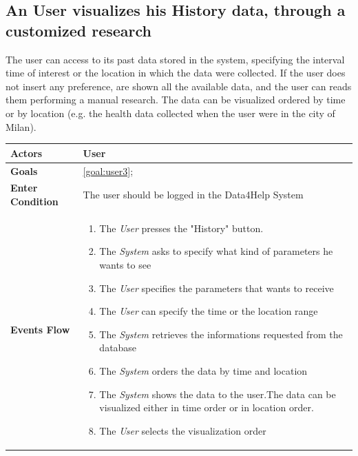  \subsection{An User visualizes his History data, through a customized research}
 
The user can access to its past data stored in the system, specifying the interval time of interest or the location in which the data were collected. If the user does not insert any preference, are shown all the available data, and the user can reads them performing a manual research.
The data can be visualized ordered by time or by location (e.g. the health data collected when the user were in the city of Milan).




\begin{table}[H]
	\centering
    
    \begin{tabular}{|p{3.5cm}|p{10.3cm}|}
    
    \hline
    \textbf{\large{Actors}}  			& \tabitem  User  				\\
    				 	

    \hline
    \textbf{\large{Goals}} 				&\ref{goal:user3};
              \\
     \hline
    \textbf{\large{Enter Condition}} 
    & The user should be logged in the Data4Help System	
           \\
    
    \hline
    \textbf{\large{Events Flow}}		& \begin{enumerate}[leftmargin=0.5cm]
                                          	\item The \emph{User}  presses the "History" button.
                                            \item The \emph{System} asks to specify what kind of parameters he wants to see
                                            \item The \emph{User} specifies the parameters that wants to receive
                              \item The \emph{User} can specify the time or the location range 
                            \item The \emph{System} retrieves the informations requested from the database
                              \item  The  \emph{System} orders the data by time and location
                                            \item The \emph{System} shows the data to the user.The data can be visualized either in time order or in location order.
            \item The \emph{User} selects the visualization order
            

\end{enumerate}
\end{tabular}
\end{table}
